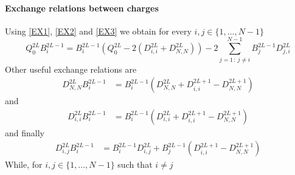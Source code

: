 \documentclass[10pt]{article}
\numberwithin{equation}{section}
\numberwithin{equation}{subsection}
\begin{document}
\paragraph{Exchange relations between charges}
Using \eqref{EX1}, \eqref{EX2} and \eqref{EX3} we obtain for every $i,j\in\{1,\ldots,N-1\}$ 
\begin{equation}\label{ExQ0B-charges}
Q_{0}^{2L}B_{i}^{2L-1}=B_{i}^{2L-1}\left(Q_{0}^{2L}-2(D_{i,i}^{2L}+D_{N,N}^{2L})\right)-2\sum_{j=1\,:\,j\neq i}^{N-1}B_{j}^{2L-1}D_{j,i}^{2L}
\end{equation}
Other useful exchange relations are 
\begin{equation}\label{ExDNB-charges}
\begin{split}
D_{N,N}^{2L}B_{i}^{2L-1}&=B_{i}^{2L-1}\left(D_{N,N}^{2L}+D_{i,i}^{2L+1}-D_{N,N}^{2L+1}\right)%
\end{split}
\end{equation}
and
\begin{equation}\label{ExDiB-charges}
\begin{split}
D_{i,i}^{2L}B_{i}^{2L-1}&=B_{i}^{2L-1}\left(D_{i,i}^{2L}+D_{i,i}^{2L+1}-D_{N,N}^{2L+1}\right)%
\end{split}
\end{equation}
and finally
\begin{equation}\label{ExDijB-charges}
\begin{split}
D_{i,j}^{2L}B_{i}^{2L-1}&=B_{i}^{2L-1}D_{i,j}^{2L}+B_{j}^{2L-1}\left(D_{i,i}^{2L+1}-D_{N,N}^{2L+1}\right)%
\end{split}
\end{equation}
While, for $i,j\in\{1,\ldots,N-1\}$ such that $i\neq j$
\end{document}
